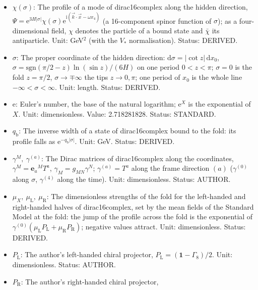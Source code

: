 \documentclass[
  10pt,
]{article}
\providecommand{\tightlist}{%
  \setlength{\itemsep}{0pt}\setlength{\parskip}{0pt}}
\begin{document}
\begin{itemize}
\tightlist
\item
  \(\chi(\sigma)\): The profile of a mode of dirac16complex along the
  hidden direction,
  \(\Psi = \mathrm{e}^{3H\lvert\sigma\rvert}\chi(\sigma)\mathrm{e}^{\mathrm{i}(\vec k\cdot\vec x - \omega x_4)}\)
  (a 16-component spinor function of \(\sigma\)); as a four-dimensional
  field, \(\chi\) denotes the particle of a bound state and \(\bar\chi\)
  its antiparticle. Unit: GeV\(^{2}\) (with the \(V_*\) normalisation).
  Status: DERIVED.
\item
  \(\sigma\): The proper coordinate of the hidden direction:
  \(\mathrm{d}\sigma = \lvert\cot z\rvert\,\mathrm{d}x_0\),
  \(\sigma = \mathrm{sgn}(\pi/2 - z)\ln(\sin z)/(6H)\) on one period
  \(0 < z < \pi\); \(\sigma = 0\) is the fold \(z = \pi/2\),
  \(\sigma \to \mp\infty\) the tips \(z \to 0, \pi\); one period of
  \(x_0\) is the whole line \(-\infty < \sigma < \infty\). Unit: length.
  Status: DERIVED.
\item
  \(\mathrm{e}\): Euler's number, the base of the natural logarithm;
  \(\mathrm{e}^{X}\) is the exponential of \(X\). Unit: dimensionless.
  Value: 2.718281828. Status: STANDARD.
\item
  \(q_{\mathrm{b}}\): The inverse width of a state of dirac16complex
  bound to the fold: its profile falls as
  \(\mathrm{e}^{-q_{\mathrm{b}}\lvert\sigma\rvert}\). Unit: GeV. Status:
  DERIVED.
\item
  \(\gamma^M,\ \gamma^{(a)}\): The Dirac matrices of dirac16complex
  along the coordinates, \(\gamma^M = \mathbf{e}_a{}^MT^a\),
  \(\gamma_M = g_{MN}\gamma^N\); \(\gamma^{(a)} = T^a\) along the frame
  direction \((a)\) (\(\gamma^{(0)}\) along \(\sigma\), \(\gamma^{(4)}\)
  along the time). Unit: dimensionless. Status: AUTHOR.
\item
  \(\mu_X,\ \mu_{\mathrm{L}},\ \mu_{\mathrm{R}}\): The dimensionless
  strengths of the fold for the left-handed and right-handed halves of
  dirac16complex, set by the mean fields of the Standard Model at the
  fold: the jump of the profile across the fold is the exponential of
  \(\gamma^{(0)}(\mu_{\mathrm{L}}P_{\mathrm{L}} + \mu_{\mathrm{R}}P_{\mathrm{R}})\);
  negative values attract. Unit: dimensionless. Status: DERIVED.
\item
  \(P_{\mathrm{L}}\): The author's left-handed chiral projector,
  \(P_{\mathrm{L}} = (\mathbf{1} - \Gamma_8)/2\). Unit: dimensionless.
  Status: AUTHOR.
\item
  \(P_{\mathrm{R}}\): The author's right-handed chiral projector,

\end{itemize}
\end{document}
